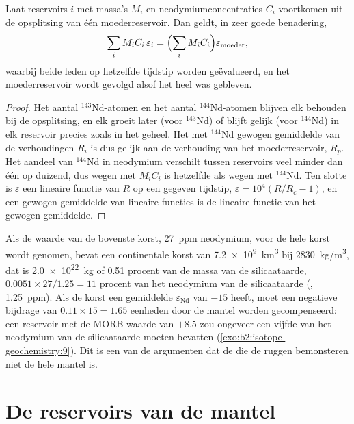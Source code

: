 \begin{proposition}\label{prop:b2:isotope-geochemistry:mass-balance}
Laat reservoirs $i$ met massa's $M_i$ en neodymiumconcentraties $C_i$ voortkomen uit
de opsplitsing van één moederreservoir. Dan geldt, in zeer goede benadering,
\[
  \sum_i M_i C_i\, \varepsilon_i = \Bigl(\sum_i M_i C_i\Bigr) \varepsilon_{\text{moeder}},
\]
waarbij beide leden op hetzelfde tijdstip worden geëvalueerd, en het moederreservoir wordt gevolgd alsof
het heel was gebleven.
\end{proposition}

\begin{proof}
Het aantal $^{143}\mathrm{Nd}$-atomen en het aantal $^{144}\mathrm{Nd}$-atomen
blijven elk behouden bij de opsplitsing, en elk groeit later (voor
$^{143}\mathrm{Nd}$) of blijft gelijk (voor $^{144}\mathrm{Nd}$) in elk reservoir precies zoals
in het geheel. Het met $^{144}\mathrm{Nd}$ gewogen gemiddelde van de verhoudingen $R_i$ is dus gelijk aan
de verhouding van het moederreservoir, $R_p$. Het aandeel van $^{144}\mathrm{Nd}$ in neodymium verschilt
tussen reservoirs veel minder dan één op duizend, dus wegen met
$M_iC_i$ is hetzelfde als wegen met $^{144}\mathrm{Nd}$. Ten slotte is $\varepsilon$ een
lineaire functie van $R$ op een gegeven tijdstip, $\varepsilon = 10^4(R/R_c - 1)$, en een
gewogen gemiddelde van lineaire functies is de lineaire functie van het gewogen gemiddelde.
\end{proof}

Als de waarde van de bovenste korst, \qty{27}{ppm} neodymium, voor de hele
korst wordt genomen, bevat een continentale korst van \qty{7.2e9}{km^3} bij \qty{2830}{kg/m^3}, dat is
\qty{2.0e22}{kg} of 0.51 procent van de massa van de silicaataarde,
$0.0051\times27/1.25 = 11$ procent van het neodymium van de silicaataarde (, \qty{1.25}{ppm}). Als de korst een gemiddelde $\varepsilon_{\mathrm{Nd}}$ van
$-15$ heeft, moet een negatieve bijdrage van $0.11\times15 = 1.65$ eenheden
door de mantel worden gecompenseerd: een reservoir met de MORB-waarde van $+8.5$ zou
ongeveer een vijfde van het neodymium van de silicaataarde moeten bevatten (\cref{exo:b2:isotope-geochemistry:9}). Dit is een van de
argumenten dat de  die de ruggen bemonsteren niet de hele
mantel is.

\section{De reservoirs van de mantel}

